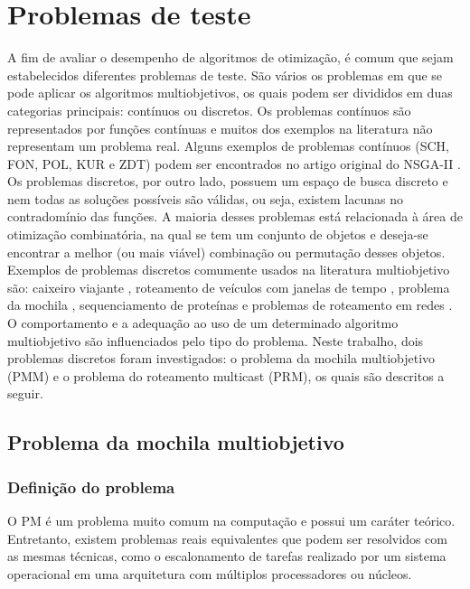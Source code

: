 \chapter[Problemas de teste]{Problemas de teste}

A fim de avaliar o desempenho de algoritmos de otimização, é comum que sejam estabelecidos diferentes problemas de teste. São vários os problemas em que se pode aplicar os algoritmos multiobjetivos, os quais podem ser divididos em duas categorias principais: contínuos ou discretos. Os problemas contínuos são representados por funções contínuas e muitos dos exemplos na literatura não representam um problema real. Alguns exemplos de problemas contínuos (SCH, FON, POL, KUR e ZDT) podem ser encontrados no artigo original do NSGA-II \cite{Deb2002}. Os problemas discretos, por outro lado, possuem um espaço de busca discreto e nem todas as soluções possíveis são válidas, ou seja, existem lacunas no contradomínio das funções. A maioria desses problemas está relacionada à área de otimização combinatória, na qual se tem um conjunto de objetos e deseja-se encontrar a melhor (ou mais viável) combinação ou permutação desses objetos. Exemplos de problemas discretos comumente usados na literatura multiobjetivo são: caixeiro viajante \cite{MTSP}, roteamento de veículos com janelas de tempo \cite{VehicleRouting}, problema da mochila \cite{MKP}, sequenciamento de proteínas \cite{Brasil2013} e problemas de roteamento em redes \cite{Lafeta2017}. O comportamento e a adequação ao uso de um determinado algoritmo multiobjetivo são influenciados pelo tipo do problema. Neste trabalho, dois problemas discretos foram investigados: o problema da mochila multiobjetivo (PMM) e o problema do roteamento multicast (PRM), os quais são descritos a seguir.

\section{Problema da mochila multiobjetivo}
\label{section_problemas_pmm}

\subsection{Definição do problema}

O \ac{PM} é um problema muito comum na computação e possui um caráter teórico. Entretanto, existem problemas reais equivalentes que podem ser resolvidos com as mesmas técnicas, como o escalonamento de tarefas realizado por um sistema operacional em uma arquitetura com múltiplos processadores ou núcleos.

